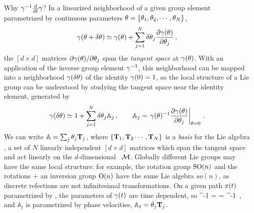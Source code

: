 Why $\gamma^{-1}\frac{d}{dt}\gamma$?
In a linearized neighborhood of a given group element
parametrized by continuous parameters
$\theta=\{\theta_1,\theta_2,\cdots,\theta_N\}$,
\[
\gamma(\theta+\delta\theta) \simeq \gamma(\theta)
+  \sum_{j=1}^N  \delta\theta_j
	\frac{\partial \gamma(\theta)}{\partial \theta_j}
\,,
\]
the $[d\!\times\!d]$ matrices
\(
{\partial \gamma(\theta)}/{\partial \theta_j}
\)
span the \emph{tangent space} at $\gamma(\theta)$. With an application
of the inverse group element $\gamma^{-1}$, this neighborhood can be
mapped into a neighborhood $\gamma(\delta\theta)$ of the identity
$\gamma(0)=1$, so the local structure of a Lie group can be understood by
studying the tangent space near the identity element, generated by
\[
\gamma(\delta\theta) \simeq 1
+ \sum_{j=1}^N \delta\theta_j \mathbb{A}_j
    \,,\qquad
\mathbb{A}_j
    =
    \left.
	\gamma(\theta)^{-1}
	\frac{\partial \gamma(\theta)}{\partial \theta_j}
		\right|_{\theta=0}
\,.
\]
We can write $\mathbb{A} = \sum_j \theta_j \mathbf{T}_j$,
where
$\{\mathbf{T}_1,\mathbf{T}_2\cdots,\mathbf{T}_N\}$ is a {\em basis} for the
Lie algebra \LieAlg, a set of $N$ linearly independent
$[d\!\times\!d]$ matrices which span the tangent space and act linearly
on the $d$-dim\-ens\-ion\-al \statesp\ $\mathcal{M}$.
Globally
different Lie groups may have the same local structure: for example,
the rotation group $\textrm{SO}(n)$ and
the rotations + an inversion group $\textrm{O}(n)$ have the same Lie algebra $so(n)$, as
discrete refections are not infinitesimal transformations.
On a given path $x(t)$ parametrized by \zeit, the parameters of
$\gamma(t)$ are time dependent,
so
\beq
\LieEl^{-1} =
= \LieEl^{-1} 
\,,
and $\mathbb{A}_t$ is parametrized by phase velocities,
$\mathbb{A}_t = \dot{\theta}_j\mathbf{T}_j$.

